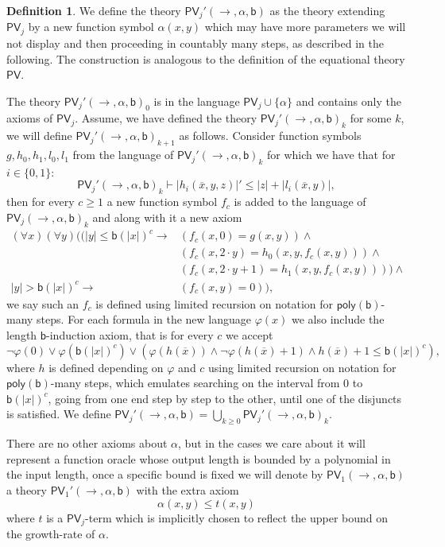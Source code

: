 \documentclass[11pt]{article}
\newcommand{\poly}{\mathsf{poly}}
\newcommand{\PV}{\mathsf{PV}}
\newcommand{\bd}{\mathsf{b}}
\newcommand{\abs}[1]{\lvert #1 \rvert}
\theoremstyle{definition}
\theoremstyle{definition}
\newtheorem{definition}[theorem]{Definition}
\theoremstyle{remark}
\begin{document}
\begin{definition}
    We define the theory $\PV_j'(\to, \alpha,\bd)$ as the theory extending $\PV_j$ by a new function symbol $\alpha(x,y)$ which may have more parameters we will not display and then proceeding in countably many steps, as described in the following. The construction is analogous to the definition of the equational theory $\PV$.

    The theory $\PV_j'(\to,\alpha,\bd)_0$ is in the language $\PV_j\cup\{\alpha\}$ and contains only the axioms of $\PV_j$. Assume, we have defined the theory $\PV_j'(\to,\alpha,\bd)_k$ for some $k$, we will define $\PV_j'(\to,\alpha,\bd)_{k+1}$ as follows. Consider function symbols $g,h_0,h_1,l_0,l_1$ from the language of $\PV_j'(\to,\alpha,\bd)_{k}$ for which we have that for $i\in\{0,1\}$:
    \[\PV_j'(\to,\alpha,\bd)_k\vdash \abs{h_i(\overline x,y,z)}'\leq\abs{z}+\abs{l_i(\overline x,y)},\]
    then for every $c\geq 1$ a new function symbol $f_c$ is added to the language of $\PV_j(\to,\alpha,\bd)_k$ and along with it a new axiom 
    \begin{align*}
        (\forall x)(\forall y)((\abs{y}\leq \bd(\abs{x})^c\to &(f_c(x,0)=g(x,y))\land \\
        &(f_c(x,2\cdot y)=h_0(x,y,f_c(x,y)))\land\\
        &(f_c(x,2\cdot y+1)=h_1( x,y,f_c(x,y))))\land\\
        \abs{y}>\bd(\abs{x})^c\to &(f_c(x,y)=0)),
    \end{align*}
    we say such an $f_c$ is defined using limited recursion on notation for $\poly(\bd)$-many steps. For each formula in the new language $\varphi(x)$ we also include the length $\bd$-induction axiom, that is for every $c$ we accept
    \[\lnot \varphi(0)\lor \varphi(\bd(\abs{x})^c) \lor (\varphi(h(\overline x))\land \lnot \varphi(h(\overline x)+1)\land h(\overline x)+1\leq \bd(\abs{x})^c),\]
    where $h$ is defined depending on $\varphi$ and $c$ using limited recursion on notation for $\poly(\bd)$-many steps, which emulates searching on the interval from $0$ to $\bd(\abs{x})^c$, going from one end step by step to the other, until one of the  disjuncts is satisfied.
    We define $\PV_j'(\to,\alpha,\bd)=\bigcup_{k\geq 0}\PV_j'(\to,\alpha,\bd)_k.$

    There are no other axioms about $\alpha$, but in the cases we care about it will represent a function oracle whose output length is bounded by a polynomial in the input length, once a specific bound is fixed we will denote by $\PV_1(\to, \alpha,\bd)$ a theory $\PV_1'(\to, \alpha,\bd)$ with the extra axiom
    \[\alpha(x,y)\leq t(x,y)\]
    where $t$ is a $\PV_j$-term which is implicitly chosen to reflect the upper bound on the growth-rate of $\alpha$.
\end{definition}
\end{document}
